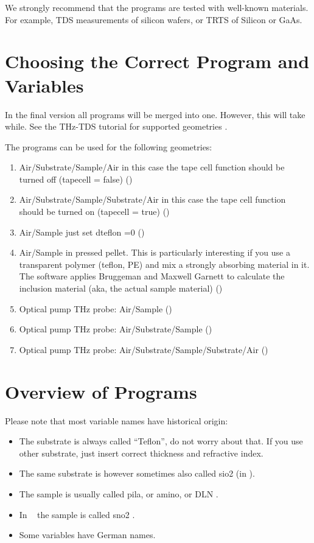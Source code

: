 \documentclass[12pt]{article}
\begin{document}
We strongly recommend that the programs are tested with well-known materials. For example, TDS measurements of silicon wafers, or TRTS of Silicon or GaAs. 
						
\section{Choosing the Correct Program and Variables}
In the final version all programs will be merged into one. However, this will take while. See the THz-TDS tutorial for supported geometries \cite{Neu2018}.


The programs can be used for the following geometries:
\begin{enumerate}
	\item Air/Substrate/Sample/Air in this case the tape cell function should be turned off (tapecell = false) (\textbf{\TDS})
	\item Air/Substrate/Sample/Substrate/Air   in this case the tape cell function should be turned on (tapecell = true) (\textbf{\TDS})
	\item Air/Sample just set dteflon =0 (\textbf{\TDS})
	\item Air/Sample in pressed pellet. This is particularly interesting if you use a transparent polymer (teflon, PE) and mix a strongly absorbing material in it. The software applies Bruggeman and Maxwell Garnett to calculate the inclusion material (aka, the actual sample material) (\textbf{\pellet})
	\item Optical pump THz probe: Air/Sample (\textbf{\TRTS})
	\item Optical pump THz probe: Air/Substrate/Sample (\textbf{\TRTS})
	\item Optical pump THz probe: Air/Substrate/Sample/Substrate/Air (\textbf{\TRTS})
\end{enumerate}
   
 

\section{Overview of Programs}

Please note that most variable names have historical origin: 
\begin{itemize}
\item	The substrate is always called "`Teflon"', do not worry about that. If you use other substrate, just insert correct thickness and refractive index. 
\item	The same substrate is however sometimes also called sio2 (in \TRTS).
\item	The sample is usually called pila, or amino, or DLN .
\item In \TRTS~ the sample is called sno2 .
\item Some variables have German names.
\end{itemize}
\end{document}

